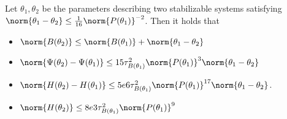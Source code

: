 \begin{lemma}
    \label{lem: helper lemma for RC}
    Let $\theta_1, \theta_2$ be the parameters describing two stabilizable systems satisfying $\norm{\theta_1 - \theta_2}\leq\frac{1}{16}\norm{P(\theta_1)}^{-2}$. Then it holds that
    \begin{itemize}
        \item $\norm{B(\theta_2)}\leq \norm{B(\theta_1)} + \norm{\theta_1 - \theta_2}$
        \item $\norm{\Psi(\theta_2) - \Psi(\theta_1)} \leq 15\tau^2_{B(\theta_1)}\norm{P(\theta_1)}^3\norm{\theta_1-\theta_2}$
        \item $\norm{H(\theta_2)-H(\theta_1)}\leq 5e6\tau_{B(\theta_1)}^2\norm{P(\theta_1)}^{17}\norm{\theta_1-\theta_2}$.
        \item $\norm{H(\theta_2)} \leq 8e3\tau^2_{B(\theta_1)}\norm{P(\theta_1)}^9$
    \end{itemize}
\end{lemma}
